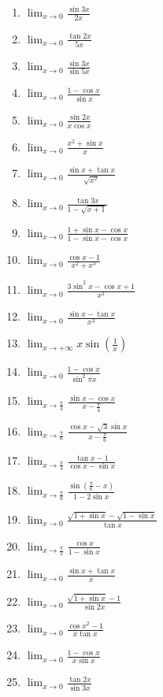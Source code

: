 \documentclass[12pt,a4paper]{article}
\begin{document}
\begin{multicols}{3}
\begin{enumerate}[leftmargin=*]
    \item $\displaystyle \lim_{x \to 0} \frac{\sin 3x}{2x}$
    \item $\displaystyle \lim_{x \to 0} \frac{\tan 2x}{5x}$
    \item $\displaystyle \lim_{x \to 0} \frac{\sin 3x}{\sin 5x}$
    \item $\displaystyle \lim_{x \to 0} \frac{1-\cos x}{\sin x}$
    \item $\displaystyle \lim_{x \to 0} \frac{\sin 2x}{x \cos x}$
    \item $\displaystyle \lim_{x \to 0} \frac{x^2 + \sin x}{x}$
    \item $\displaystyle \lim_{x \to 0} \frac{\sin x + \tan x}{\sqrt{x^2} }$
    \item $\displaystyle \lim_{x \to 0} \frac{\tan 3x}{1 - \sqrt{x + 1}}$
    \item $\displaystyle \lim_{x \to 0} \frac{1 + \sin x - \cos x}{1 - \sin x - \cos x}$
    \item $\displaystyle \lim_{x \to 0} \frac{\cos x - 1}{x^2 + x^3}$
    \item $\displaystyle \lim_{x \to 0} \frac{3\sin^2 x - \cos x + 1}{x^2}$
    \item $\displaystyle \lim_{x \to 0} \frac{\sin x - \tan x}{x^3}$
    \item $\displaystyle \lim_{x \to +\infty} x \sin\left(\frac{1}{x}\right)$ 
    \item $\displaystyle \lim_{x \to 0} \frac{1 - \cos x}{\sin^2 \pi x}$
    \item $\displaystyle \lim_{x \to \frac{\pi}{4}} \frac{\sin x - \cos x}{x - \frac{\pi}{4}}$
    \item $\displaystyle \lim_{x \to \frac{\pi}{6}} \frac{\cos x - \sqrt{3} \sin x}{ x - \frac{\pi}{6}}$
    \item $\displaystyle \lim_{x \to \frac{\pi}{4}} \frac{\tan x - 1}{\cos x - \sin x}$
    \item $\displaystyle \lim_{x \to \frac{\pi}{6}} \frac{\sin\left(\frac{\pi}{6} - x\right)}{1 - 2\sin x}$
    \item $\displaystyle \lim_{x \to 0} \frac{\sqrt{1 + \sin x} - \sqrt{1 - \sin x}}{\tan x}$
    \item $\displaystyle \lim_{x \to \frac{\pi}{2}} \frac{\cos x}{1 - \sin x}$
    \item  $\displaystyle \lim_{x \to 0 }\frac{\sin x + \tan x}{x}$
    \item  $\displaystyle \lim_{x \to 0 }\frac{\sqrt{1+\sin x}-1}{\sin 2x}$
    \item  $\displaystyle \lim_{x \to 0 }\frac{\cos x^2 - 1}{x\tan x}$
    \item  $\displaystyle \lim_{x \to 0 }\frac{1 - \cos x}{x\sin x}$
    \item  $\displaystyle \lim_{x \to 0 }\frac{\tan 2x}{\sin 3x}$
\end{enumerate}
\end{multicols}
\end{document}
